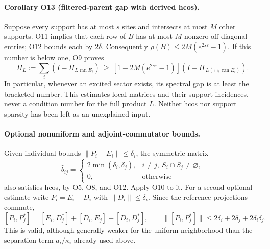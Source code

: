 \paragraph{Corollary O13 (filtered-parent gap with derived hcos).}
Suppose every support has at most $s$ sites and intersects at most
$M$ other supports. O11 implies that each row of $B$ has at most $M$
nonzero off-diagonal entries; O12 bounds each by $2\delta$.
Consequently
$\rho(B)\leq2M(e^{2s\varepsilon}-1)$.
If this number is below one, O9 proves
\[
 H_L:=\sum_i(I-\Pi_{L\operatorname{ran}E_i})
 \ \geq\
 \left[1-2M(e^{2s\varepsilon}-1)\right]
 \left(I-\Pi_{\,L(\cap_i\operatorname{ran}E_i)}\right).
\]
In particular, whenever an excited sector exists, its spectral gap is
at least the bracketed number. This estimates local matrices and their
support incidences, never a condition number for the full product $L$.
Neither hcos nor support sparsity has been left as an unexplained input.

\paragraph{Optional nonuniform and adjoint-commutator bounds.}
Given individual bounds
$\|P_i-E_i\|\leq\delta_i$, the symmetric matrix
\[
 \widehat b_{ij}=
 \begin{cases}
 2\min(\delta_i,\delta_j),&i\ne j,\ S_i\cap S_j\ne\varnothing,\\
 0,&\text{otherwise}
 \end{cases}
\]
also satisfies hcos, by O5, O8, and O12. Apply O10 to it.
For a second optional estimate write $P_i=E_i+D_i$ with
$\|D_i\|\leq\delta_i$. Since the reference projections commute,
\[
 [P_i,P_j^*]=[E_i,D_j^*]+[D_i,E_j]+[D_i,D_j^*],
 \qquad
 \|[P_i,P_j^*]\|\leq2\delta_i+2\delta_j+2\delta_i\delta_j.
\]
This is valid, although generally weaker for the uniform neighborhood
than the separation term $a_i/\kappa_i$ already used above.
